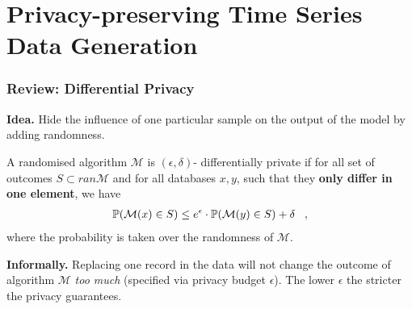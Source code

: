 \section{Privacy-preserving Time Series Data Generation}

\begin{frame}
    \frametitle{Review: Differential Privacy}
    \textbf{Idea.} \alert{Hide the influence} of one particular sample on the output of the model by \alert{adding randomness}.
    \begin{definition}
        A randomised algorithm $\mathcal{M}$ is $(\epsilon, \delta)$- differentially private if for all  set of outcomes $S \subset ran \mathcal{M}$ and for all databases $x,y $, such that they \textbf{only differ in one element}, we have
        \begin{align}
            \mathbb{P}(\mathcal{M}(x) \in S) \le e^\epsilon \cdot \mathbb{P}(\mathcal{M}(y) \in S) + \delta \;\;\;,
        \end{align}
        where the probability is taken over the randomness of $\mathcal{M}$.
    \end{definition}

    \textbf{Informally.} Replacing one record in the data will not change the outcome of algorithm $\mathcal{M}$ \textit{too much} (specified via privacy budget $\epsilon$). The lower $\epsilon$ the stricter the privacy guarantees.

\end{frame}

